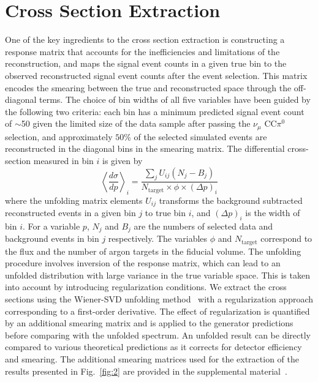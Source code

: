 \documentclass[%
 reprint,
 amsmath,amssymb, longbibliography,
 aps, 
 prd,
 twocolumn,
 showpacs,
 superscriptaddress
]{revtex4-2}
\begin{document}
\section{Cross Section Extraction}
One of the key ingredients to the cross section extraction is constructing a response matrix that accounts for the inefficiencies and limitations of the reconstruction, and maps the signal event counts in a given true bin to the observed reconstructed signal event counts after the event selection. This matrix encodes the smearing between the true and reconstructed space through the off-diagonal terms. The choice of bin widths of all five variables have been guided by the following two criteria: each bin has a minimum predicted signal event count of $\sim$50 given the limited size of the data sample after passing the $\nu_{\mu}$ CC$\pi^0$ selection, and approximately $50$\% of the selected simulated events are reconstructed in the diagonal bins in the smearing matrix. 
The differential cross-section measured in bin $i$ is given by
\begin{equation}
    \left\langle\frac{d\sigma}{dp}\right\rangle_i = \frac{\sum_j U_{ij}(N_j - B_j)}{N_{\textrm{target}} \times \phi \times (\Delta p)_i}
\end{equation}
where the unfolding matrix elements $U_{ij}$ transforms the background subtracted reconstructed events in a given bin $j$ to true bin $i$, and $(\Delta p)_i$ is the width of bin $i$. For a variable $p$, $N_j$ and $B_j$ are the numbers of selected data and background events in bin $j$ respectively. The variables $\phi$ and $N_{\textrm{target}}$ correspond to the flux and the number of argon targets in the fiducial volume. The unfolding procedure involves inversion of the response matrix, which can lead to an unfolded distribution with large variance in the true variable space. This is taken into account by introducing regularization conditions. We extract the cross sections using the Wiener-SVD unfolding method~\cite{Wiener_SVD} with a regularization approach corresponding to a first-order derivative. The effect of regularization is quantified by an additional smearing matrix and is applied to the generator predictions before comparing with the unfolded spectrum. An unfolded result can be directly compared to various theoretical predictions as it corrects for detector efficiency and smearing. The additional smearing matrices used for the extraction of the results presented in Fig.~\ref{fig:2} are provided in the supplemental material~\cite{supp_mat}. %
\end{document}
